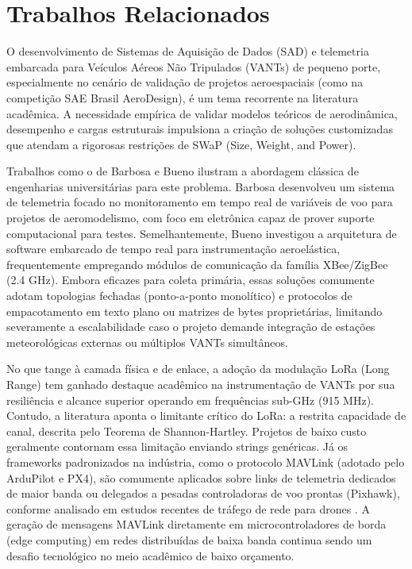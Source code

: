 \chapter{Trabalhos Relacionados}
\label{cap:trabalhos-relacionados}
O desenvolvimento de Sistemas de Aquisição de Dados (SAD) e telemetria embarcada para Veículos Aéreos Não Tripulados (VANTs) de pequeno porte, especialmente no cenário de validação de projetos aeroespaciais (como na competição SAE Brasil AeroDesign), é um tema recorrente na literatura acadêmica. A necessidade empírica de validar modelos teóricos de aerodinâmica, desempenho e cargas estruturais impulsiona a criação de soluções customizadas que atendam a rigorosas restrições de SWaP (Size, Weight, and Power).

Trabalhos como o de Barbosa \cite{barbosa2022} e Bueno \cite{bueno2015} ilustram a abordagem clássica de engenharias universitárias para este problema. Barbosa \cite{barbosa2022} desenvolveu um sistema de telemetria focado no monitoramento em tempo real de variáveis de voo para projetos de aeromodelismo, com foco em eletrônica capaz de prover suporte computacional para testes. Semelhantemente, Bueno \cite{bueno2015} investigou a arquitetura de software embarcado de tempo real para instrumentação aeroelástica, frequentemente empregando módulos de comunicação da família XBee/ZigBee (2.4 GHz). Embora eficazes para coleta primária, essas soluções comumente adotam topologias fechadas (ponto-a-ponto monolítico) e protocolos de empacotamento em texto plano ou matrizes de bytes proprietárias, limitando severamente a escalabilidade caso o projeto demande integração de estações meteorológicas externas ou múltiplos VANTs simultâneos.

No que tange à camada física e de enlace, a adoção da modulação LoRa (Long Range) tem ganhado destaque acadêmico na instrumentação de VANTs por sua resiliência e alcance superior operando em frequências sub-GHz (915 MHz). Contudo, a literatura aponta o limitante crítico do LoRa: a restrita capacidade de canal, descrita pelo Teorema de Shannon-Hartley. Projetos de baixo custo geralmente contornam essa limitação enviando strings genéricas. Já os frameworks padronizados na indústria, como o protocolo MAVLink (adotado pelo ArduPilot e PX4), são comumente aplicados sobre links de telemetria dedicados de maior banda ou delegados a pesadas controladoras de voo prontas (Pixhawk), conforme analisado em estudos recentes de tráfego de rede para drones \cite{belwafi2022}. A geração de mensagens MAVLink diretamente em microcontroladores de borda (edge computing) em redes distribuídas de baixa banda continua sendo um desafio tecnológico no meio acadêmico de baixo orçamento.

